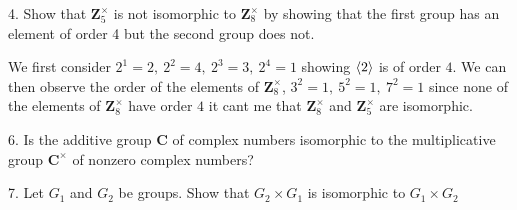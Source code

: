\begin{mdframed}[style=darkQuesion]
4. Show that $\mathbf{Z}_{5}^{\times}$ is not isomorphic to $\mathbf{Z}_{8}^{\times}$ by showing that the first group has an element of order 4 but the second group does not.
\end{mdframed}
\begin{mdframed}[style=darkAnswer,frametitle={Joe Starr}]
  We first consider $2^{1}=2,\ 2^{2}=4,\ 2^{3}=3,\ 2^{4}=1$ showing $\left<2\right>$ is of
  order $4$. We can then observe the order of the elements of 
  $\mathbf{Z}_{8}^{\times}$, $3^2=1,\ 5^2=1,\ 7^2=1$ since none of the elements 
  of $\mathbf{Z}_{8}^{\times}$ have order $4$ it cant me that 
  $\mathbf{Z}_{8}^{\times}$ and $\mathbf{Z}_{5}^{\times}$ are isomorphic. 

\end{mdframed}
\newpage
\begin{mdframed}[style=darkQuesion]
6. Is the additive group $\mathbf{C}$ of complex numbers isomorphic to the multiplicative group $\mathbf{C}^{\times}$ of nonzero complex numbers?
\end{mdframed}
\begin{mdframed}[style=darkAnswer,frametitle={Joe Starr}]
\end{mdframed}
\newpage
\begin{mdframed}[style=darkQuesion]
7. Let $G_{1}$ and $G_{2}$ be groups. Show that $G_{2} \times G_{1}$ is isomorphic to $G_{1} \times G_{2}$
\end{mdframed}
